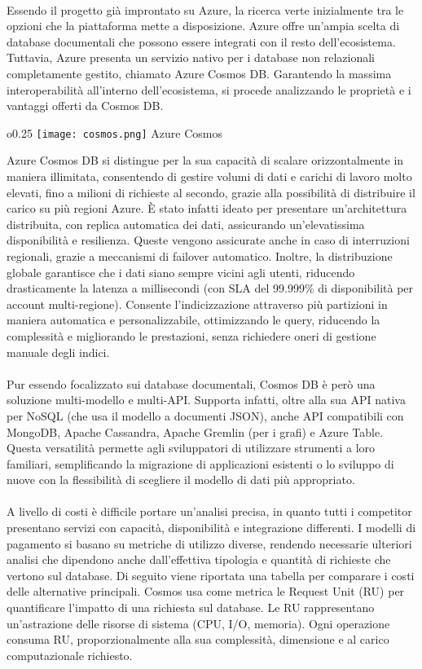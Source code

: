 \\
Essendo il progetto già improntato su Azure,
la ricerca verte inizialmente tra le opzioni che  la piattaforma mette a disposizione.
Azure offre un'ampia scelta di database documentali
che possono essere integrati con il resto dell'ecosistema.
Tuttavia, Azure presenta un servizio nativo per i database non relazionali
completamente gestito, chiamato Azure Cosmos DB.
Garantendo la massima interoperabilità all'interno dell'ecosistema,
si procede analizzando le proprietà e i vantaggi offerti da Cosmos DB.\\
\begin{wrapfigure}{o}{0.25\textwidth}
    \centering
    \texttt{[image: cosmos.png]}
    Azure Cosmos
\end{wrapfigure}
Azure Cosmos DB si distingue per la sua capacità di scalare orizzontalmente in maniera illimitata,
consentendo di gestire volumi di dati e carichi di lavoro molto elevati,
fino a milioni di richieste al secondo,
grazie alla possibilità di distribuire il carico su più regioni Azure.
È stato infatti ideato per presentare un'architettura distribuita,
con replica automatica dei dati,
assicurando un'elevatissima disponibilità e resilienza.
Queste vengono assicurate anche in caso di interruzioni regionali,
grazie a meccanismi di failover automatico.
Inoltre, la distribuzione globale garantisce che i dati siano sempre vicini agli utenti,
riducendo drasticamente la latenza a millisecondi
(con SLA del 99.999\% di disponibilità per account multi-regione).
Consente l'indicizzazione attraverso più partizioni in maniera automatica e personalizzabile, ottimizzando le query, riducendo la complessità e migliorando le prestazioni,
senza richiedere oneri di gestione manuale degli indici.\\
\\
Pur essendo focalizzato sui database documentali,
Cosmos DB è però una soluzione multi-modello e multi-API.
Supporta infatti, oltre alla sua API nativa per NoSQL (che usa il modello a documenti JSON),
anche API compatibili con MongoDB, Apache Cassandra, Apache Gremlin (per i grafi) e Azure Table.
Questa versatilità permette agli sviluppatori di utilizzare strumenti  a loro familiari,
semplificando la migrazione di applicazioni esistenti o
lo sviluppo di nuove con la flessibilità di scegliere il modello di dati più appropriato.\\
\\
A livello di costi è difficile portare un'analisi precisa,
in quanto tutti i competitor presentano servizi
con capacità, disponibilità e integrazione differenti.
I modelli di pagamento si basano su metriche di utilizzo diverse,
rendendo necessarie ulteriori analisi che dipendono anche
dall'effettiva tipologia e quantità di richieste che vertono sul database.
Di seguito viene riportata una tabella per comparare i costi delle alternative principali.
Cosmos usa come metrica le Request Unit (RU)
per quantificare l'impatto di una richiesta sul database.
Le RU rappresentano un'astrazione delle risorse di sistema (CPU, I/O, memoria).
Ogni operazione consuma RU, proporzionalmente alla sua
complessità, dimensione e al carico computazionale richiesto.\\

